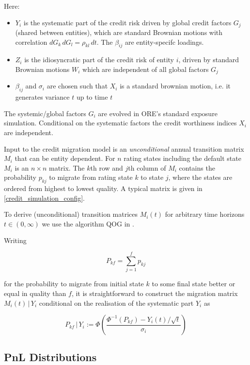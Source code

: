 \documentclass[12pt, a4paper]{article}
\begin{document}
Here:

\begin{itemize}
\item $Y_i$ is the systematic part of the credit risk driven by global credit factors $G_j$ (shared between entities),
  which are standard Brownian motions with correlation $dG_k\,dG_l = \rho_{kl}\,dt$. The $\beta_{ij}$ are entity-specifc
  loadings.
\item $Z_i$ is the idiosyncratic part of the credit risk of entity $i$, driven by standard Brownian motions $W_i$ which are independent of all
  global factors $G_j$
\item $\beta_{ij}$ and $\sigma_i$ are chosen such that $X_i$ is a standard brownian motion, i.e. it generates variance
  $t$ up to time $t$
\end{itemize}

The systemic/global factors $G_i$ are evolved in ORE's standard exposure simulation. Conditional on the systematic factors
the credit worthiness indices $X_i$ are independent.

Input to the credit migration model is an {\em unconditional} annual transition matrix $M_i$ that can be entity
dependent. For $n$ rating states including the default state $M_i$ is an $n \times n$ matrix. The $k$th row and $j$th
column of $M_i$ contains the probability $p_{kj}$ to migrate from rating state $k$ to state $j$, where the states are
ordered from highest to lowest quality. A typical matrix is given in \ref{credit_simulation_config}.

To derive (unconditional) transition matrices $M_i(t)$ for arbitrary time horizons $t \in (0,\infty)$ we use the
algorithm QOG in \cite{Kreinin2001}.

Writing

\begin{equation}
 P_{kf} = \sum_{j=1}^f p_{kj}
\end{equation}

for the probability to migrate from initial state $k$ to some final state better or equal in quality than $f$, it is
straightforward to construct the migration matrix $M_i(t)\,|\,Y_i$ conditional on the realisation of the systematic part
$Y_i$ as

\begin{equation}
P_{kf}\,|\, Y_i := \Phi\left( \frac{\Phi^{-1}(P_{kf}) - Y_i(t) / \sqrt{t}}{\sigma_i} \right)
\end{equation}

\subsection{PnL Distributions}
\end{document}
